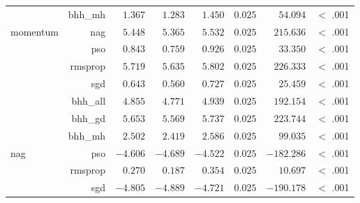 \begin{table}[H]
{\begin{tabular}{lrrrrrrr}
			                     & bhh\_mh              & $1.367$              & $1.283$                                         & $1.450$              & $0.025$              & $54.094$             & $<$ .001    \\
			momentum             & nag                  & $5.448$              & $5.365$                                         & $5.532$              & $0.025$              & $215.636$            & $<$ .001    \\
			$ $                  & pso                  & $0.843$              & $0.759$                                         & $0.926$              & $0.025$              & $33.350$             & $<$ .001    \\
			                     & rmsprop              & $5.719$              & $5.635$                                         & $5.802$              & $0.025$              & $226.333$            & $<$ .001    \\
			                     & sgd                  & $0.643$              & $0.560$                                         & $0.727$              & $0.025$              & $25.459$             & $<$ .001    \\
			                     & bhh\_all             & $4.855$              & $4.771$                                         & $4.939$              & $0.025$              & $192.154$            & $<$ .001    \\
			                     & bhh\_gd              & $5.653$              & $5.569$                                         & $5.737$              & $0.025$              & $223.744$            & $<$ .001    \\
			                     & bhh\_mh              & $2.502$              & $2.419$                                         & $2.586$              & $0.025$              & $99.035$             & $<$ .001    \\
			nag                  & pso                  & $-4.606$             & $-4.689$                                        & $-4.522$             & $0.025$              & $-182.286$           & $<$ .001    \\
			$ $                  & rmsprop              & $0.270$              & $0.187$                                         & $0.354$              & $0.025$              & $10.697$             & $<$ .001    \\
			                     & sgd                  & $-4.805$             & $-4.889$                                        & $-4.721$             & $0.025$              & $-190.178$           & $<$ .001    \\

\end{tabular}}
\end{table}
